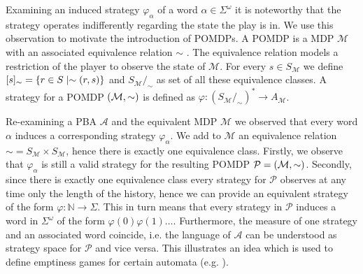 Examining an induced strategy $\varphi_{\alpha}$ of a word
$\alpha\in\Sigma^{\omega}$ it is noteworthy that the strategy operates
indifferently regarding the state the play is in. We use this observation to
motivate the introduction of \acp{POMDP}. A \ac{POMDP} is a \ac{MDP}
$\mathcal{M}$ with an associated equivalence relation $\sim$
\cite{RandAutoInfTrees}. The equivalence relation models a restriction of the
player to observe the state of $\mathcal{M}$. For every
$s\in S_{\mathcal{M}}$ we define
$[s]_{\sim} = \left\{r\in S\mid \sim(r,s)\right\}$ and
$S_{\mathcal{M}}/_{\sim}$ as set of all these equivalence classes. A
strategy for a \ac{POMDP} $\left(\mathcal{M}, \sim\right)$ is defined as
$\varphi:(S_{\mathcal{M}}/_{\sim})^{*}\rightarrow A_{\mathcal{M}}$.
\begin{example}
  Re-examining a \ac{PBA} $\mathcal{A}$ and the equivalent \ac{MDP}
  $\mathcal{M}$ we observed that every word $\alpha$ induces a corresponding
  strategy $\varphi_{\alpha}$. We add to $\mathcal{M}$ an equivalence relation
  $\sim = S_{\mathcal{M}} \times S_{\mathcal{M}}$, hence there is exactly
  one equivalence class. Firstly, we observe that $\varphi_{\alpha}$ is still a
  valid strategy for the resulting \ac{POMDP}
  $\mathcal{P} = \left(\mathcal{M}, \sim\right)$. Secondly, since there is
  exactly one equivalence class every strategy for $\mathcal{P}$ observes at
  any time only the length of the history, hence we can provide an equivalent
  strategy of the form $\varphi:\mathbb{N}\rightarrow \Sigma$. This in turn
  means that every strategy in $\mathcal{P}$ induces a word in $\Sigma^{\omega}$
  of the form $\varphi(0)\varphi(1)\dots$. Furthermore, the measure of one
  strategy and an associated word coincide, i.e. the language of $\mathcal{A}$
  can be understood as strategy space for $\mathcal{P}$ and vice versa. This
  illustrates an idea which is used to define emptiness games for certain
  automata (e.g. \cite[Proposition 45]{RandAutoInfTrees}).
\end{example}

